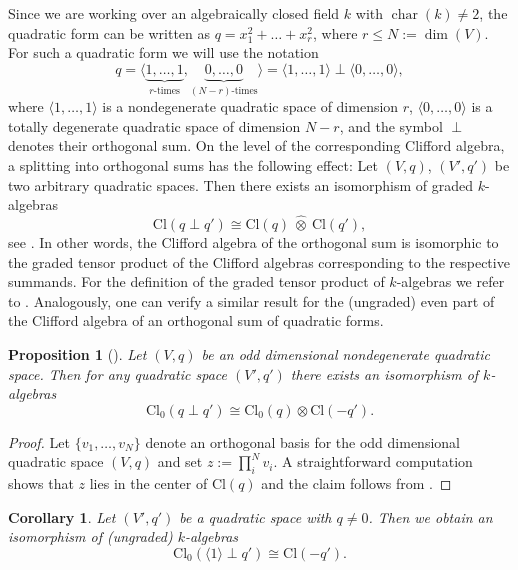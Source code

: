 \documentclass[a4paper, twoside, 11pt]{amsart}
\newtheorem{proposition}[theorem]{Proposition}
\newtheorem{corollary}{Corollary}[theorem]
\theoremstyle{definition}
\theoremstyle{remark}
\numberwithin{equation}{theorem}
\DeclareMathOperator{\characteris}{char}
\newcommand{\evencl}{\mathrm{Cl}_0}
\newcommand{\cl}{\mathrm{Cl}}
\begin{document}
Since we are working over an algebraically closed field $k$ with $\characteris(k) \neq 2$, the quadratic form can be written as $q= x_1^2 + \dots +x_r^2$, where $r \leq N :=\dim(V)$. For such a quadratic form we will use the notation
\begin{equation*}
    q = \langle \underbrace{1,\dots, 1}_{r\text{-times}},\underbrace{0,\dots,0}_{(N-r)\text{-times}} \rangle = \langle 1,\dots,1\rangle \perp \langle0, \dots,0\rangle,
\end{equation*}
where $\langle 1,\dots,1\rangle $ is a nondegenerate quadratic space of dimension $r$, $\langle0, \dots,0\rangle$ is a totally degenerate quadratic space of dimension $N-r$, and the symbol $\perp$ denotes their orthogonal sum. On the level of the corresponding Clifford algebra, a splitting into orthogonal sums has the following effect: Let $(V,q)$, $(V',q')$ be two arbitrary quadratic spaces. Then there exists an isomorphism of graded $k$-algebras
    \begin{equation*}
        \cl(q \perp q') \cong \cl(q) \ \widehat{\otimes} \ \cl(q'),
    \end{equation*}
see \cite[Ch. V,§1, Lemma 1.7]{Lam_quadratic}. In other words, the Clifford algebra of the orthogonal sum is isomorphic to the graded tensor product of the Clifford algebras corresponding to the respective summands. For the definition of the graded tensor product of $k$-algebras we refer to \cite[Ch. IV,§2]{Lam_quadratic}.
Analogously, one can verify a similar result for the (ungraded) even part of the Clifford algebra of an orthogonal sum of quadratic forms. 
\begin{proposition}[{\cite[Theorem 2.8]{Lam_quadratic}}]\label{Lams_theorem_odd}
    Let $(V,q)$ be an odd dimensional nondegenerate quadratic space. Then for any quadratic space $(V',q')$ there exists an isomorphism of $k$-algebras
    \begin{equation*}
        \evencl( q \perp q') \cong \evencl(q) \otimes \cl(-q').
    \end{equation*}
\end{proposition}
\begin{proof}
    Let $\{v_1,\dots,v_N\}$ denote an orthogonal basis for the odd dimensional quadratic space $(V,q)$ and set $z:=\prod^N_iv_i$. A straightforward computation shows that $z$ lies in the center of $\cl(q)$ and the claim follows from \cite[Theorem 2.8]{Lam_quadratic}.
\end{proof}
\begin{corollary}\label{lam_corr}
    Let $(V',q')$ be a quadratic space with $q\neq 0$. Then we obtain an isomorphism of (ungraded) $k$-algebras
    \begin{equation}
        \evencl(\langle 1 \rangle \perp q') \cong \cl(-q').
    \end{equation}
\end{corollary}
\end{document}
